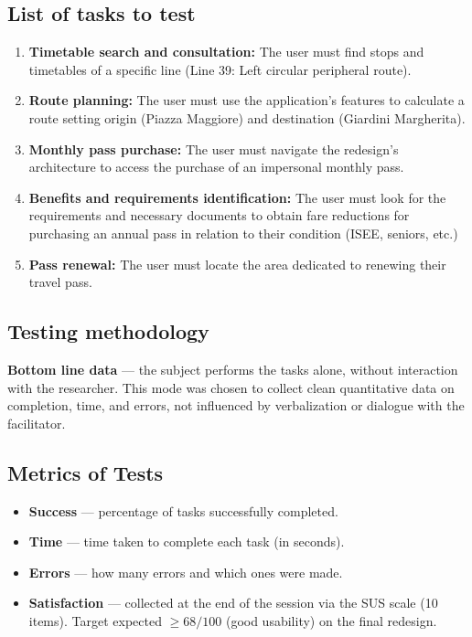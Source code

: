 ﻿\documentclass[11pt,a4paper]{article}
\begin{document}
\subsection*{List of tasks to test}
\begin{tcolorbox}[base]
\begin{enumerate}[leftmargin=*,itemsep=4pt]
  \item \textbf{Timetable search and consultation:} The user must
  find stops and timetables of a specific line (Line 39:
  Left circular peripheral route).
  \item \textbf{Route planning:} The user must
  use the application's features to
  calculate a route setting origin (Piazza Maggiore) and
  destination (Giardini Margherita).
  \item \textbf{Monthly pass purchase:} The user
  must navigate the redesign's architecture to access
  the purchase of an impersonal monthly pass.
  \item \textbf{Benefits and requirements identification:}
  The user must look for the requirements and necessary documents to
  obtain fare reductions for purchasing an
  annual pass in relation to their condition (ISEE, seniors, etc.)
  \item \textbf{Pass renewal:} The user
  must locate the area dedicated to renewing their travel
  pass.
\end{enumerate}
\end{tcolorbox}

\vspace{0.2cm}

\subsection*{Testing methodology}
\textbf{Bottom line data} --- the subject
performs the tasks alone, without interaction with the researcher.
This mode was chosen to collect clean
quantitative data on completion, time, and errors,
not influenced by verbalization or dialogue with
the facilitator.

\vspace{0.2cm}

\subsection*{Metrics of Tests}
\begin{itemize}[leftmargin=*,itemsep=3pt]
  \item \textbf{Success} --- percentage of tasks
  successfully completed.
  \item \textbf{Time} --- time taken to complete
  each task (in seconds).
  \item \textbf{Errors} --- how many errors and which ones were made.
  \item \textbf{Satisfaction} --- collected at the end of the session
  via the SUS scale (10 items). Target expected $\ge 68/100$
  (good usability) on the final redesign.
\end{itemize}
\end{document}
